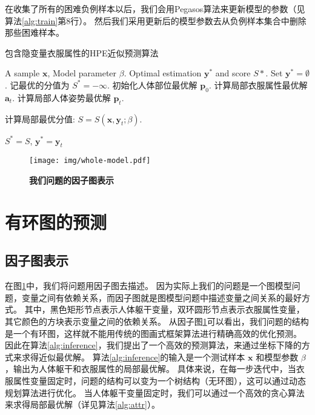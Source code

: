 在收集了所有的困难负例样本以后，我们会用Pegasos算法\cite{pegasos}来更新模型的参数（见算法\ref{alg:train}第8行）。
然后我们采用更新后的模型参数去从负例样本集合中删除那些困难样本。


\begin{algorithm}
\caption{包含隐变量衣服属性的HPE近似预测算法}
\begin{algorithmic}[1]
    \REQUIRE A sample $\mathbf{x}$, Model parameter $\beta$.
    \ENSURE Optimal estimation $\mathbf{y}^*$ and score $S*$.
    \STATE Set $\mathbf{y}^* = \emptyset$.
    \STATE 记最优的分值为 $S^* = -\infty$.
    \STATE 初始化人体部位最优解 $\mathbf{p}_0$.
    \REPEAT
        \STATE 计算局部衣服属性最优解 $\mathbf{a}_t$.
        \STATE 计算局部人体姿势最优解 $\mathbf{p}_t$.

        \STATE 计算局部最优分值: $S = S(\mathbf{x}, \mathbf{y}_t; \beta)$.

            \STATE $S^* = S$, $\mathbf{y}^* = \mathbf{y}_t $
        \ENDIF
\end{algorithmic}
\label{alg:inference}
\end{algorithm}


\begin{figure}[tbp]
\centering
\texttt{[image: img/whole-model.pdf]}
\caption{ \textbf{我们问题的因子图表示} }
\label{fig:graph}
\end{figure}

\section{有环图的预测}
\label{subsec:inference}

\subsection{因子图表示}
在图\ref{fig:graph}中，我们将问题用因子图去描述。
因为实际上我们的问题是一个图模型问题，变量之间有依赖关系，而因子图就是图模型问题中描述变量之间关系的最好方式。
其中，黑色矩形节点表示人体躯干变量，双环圆形节点表示衣服属性变量，其它颜色的方块表示变量之间的依赖关系。
从因子图\ref{fig:graph}可以看出，我们问题的结构是一个有环图，这样就不能用传统的图画式框架算法进行精确高效的优化预测。
因此在算法\ref{alg:inference}，我们提出了一个高效的预测算法，来通过坐标下降的方式来求得近似最优解。
算法\ref{alg:inference}的输入是一个测试样本 $\mathbf{x}$ 和模型参数 $\beta$，输出为人体躯干和衣服属性的局部最优解。
具体来说，在每一步迭代中，当衣服属性变量固定时，问题的结构可以变为一个树结构（无环图），这可以通过动态规划算法\cite{ps2}进行优化。
当人体躯干变量固定时，我们可以通过一个高效的贪心算法来求得局部最优解（详见算法\ref{alg:attr}）。

